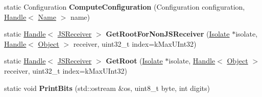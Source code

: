 \begin{DoxyCompactItemize}
\item 
static Configuration {\bfseries Compute\+Configuration} (Configuration configuration, \hyperlink{classv8_1_1internal_1_1_handle}{Handle}$<$ \hyperlink{classv8_1_1internal_1_1_name}{Name} $>$ name)\hypertarget{classv8_1_1internal_1_1_b_a_s_e___e_m_b_e_d_d_e_d_a59d31c0ef10541430be719be0afabfba}{}\label{classv8_1_1internal_1_1_b_a_s_e___e_m_b_e_d_d_e_d_a59d31c0ef10541430be719be0afabfba}

\item 
static \hyperlink{classv8_1_1internal_1_1_handle}{Handle}$<$ \hyperlink{classv8_1_1internal_1_1_j_s_receiver}{J\+S\+Receiver} $>$ {\bfseries Get\+Root\+For\+Non\+J\+S\+Receiver} (\hyperlink{classv8_1_1internal_1_1_isolate}{Isolate} $\ast$isolate, \hyperlink{classv8_1_1internal_1_1_handle}{Handle}$<$ \hyperlink{classv8_1_1internal_1_1_object}{Object} $>$ receiver, uint32\+\_\+t index=k\+Max\+U\+Int32)\hypertarget{classv8_1_1internal_1_1_b_a_s_e___e_m_b_e_d_d_e_d_a4bebbd51064be80b3b3e8b76a5f8a213}{}\label{classv8_1_1internal_1_1_b_a_s_e___e_m_b_e_d_d_e_d_a4bebbd51064be80b3b3e8b76a5f8a213}

\item 
static \hyperlink{classv8_1_1internal_1_1_handle}{Handle}$<$ \hyperlink{classv8_1_1internal_1_1_j_s_receiver}{J\+S\+Receiver} $>$ {\bfseries Get\+Root} (\hyperlink{classv8_1_1internal_1_1_isolate}{Isolate} $\ast$isolate, \hyperlink{classv8_1_1internal_1_1_handle}{Handle}$<$ \hyperlink{classv8_1_1internal_1_1_object}{Object} $>$ receiver, uint32\+\_\+t index=k\+Max\+U\+Int32)\hypertarget{classv8_1_1internal_1_1_b_a_s_e___e_m_b_e_d_d_e_d_aa5bdc27baeca845932858b979de12a2f}{}\label{classv8_1_1internal_1_1_b_a_s_e___e_m_b_e_d_d_e_d_aa5bdc27baeca845932858b979de12a2f}

\item 
static void {\bfseries Print\+Bits} (std\+::ostream \&os, uint8\+\_\+t byte, int digits)\hypertarget{classv8_1_1internal_1_1_b_a_s_e___e_m_b_e_d_d_e_d_a7584e865f75486f1518f01743c1f8d02}{}\label{classv8_1_1internal_1_1_b_a_s_e___e_m_b_e_d_d_e_d_a7584e865f75486f1518f01743c1f8d02}

\end{DoxyCompactItemize}
